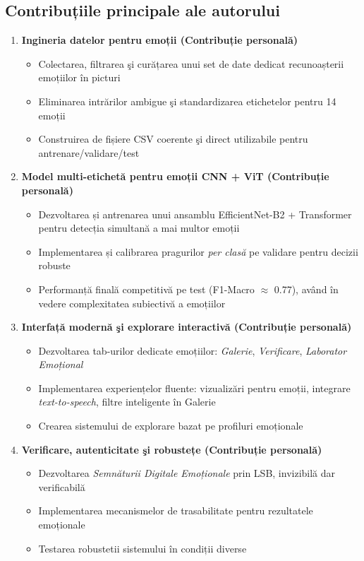 \subsection*{Contribuțiile principale ale autorului}
\begin{enumerate}
  \item \textbf{Ingineria datelor pentru emoții (Contribuție personală)}
  \begin{itemize}
    \item Colectarea, filtrarea şi curățarea unui set de date dedicat recunoașterii emoțiilor în picturi
    \item Eliminarea intrărilor ambigue şi standardizarea etichetelor pentru 14 emoții
    \item Construirea de fișiere CSV coerente şi direct utilizabile pentru antrenare/validare/test
  \end{itemize}

  \item \textbf{Model multi-etichetă pentru emoții CNN + ViT (Contribuție personală)}
  \begin{itemize}
    \item Dezvoltarea și antrenarea unui ansamblu EfficientNet-B2 + Transformer pentru detecția simultană a mai multor emoții
    \item Implementarea și calibrarea pragurilor \emph{per clasă} pe validare pentru decizii robuste
    \item Performanță finală competitivă pe test (F1-Macro $\approx$ 0.77), având în vedere complexitatea subiectivă a emoțiilor
  \end{itemize}

  \item \textbf{Interfață modernă şi explorare interactivă (Contribuție personală)}
  \begin{itemize}
    \item Dezvoltarea tab-urilor dedicate emoțiilor: \emph{Galerie}, \emph{Verificare}, \emph{Laborator Emoțional}
    \item Implementarea experiențelor fluente: vizualizări pentru emoții, integrare \emph{text-to-speech}, filtre inteligente în Galerie
    \item Crearea sistemului de explorare bazat pe profiluri emoționale
  \end{itemize}

  \item \textbf{Verificare, autenticitate şi robustețe (Contribuție personală)}
  \begin{itemize}
    \item Dezvoltarea \emph{Semnăturii Digitale Emoționale} prin LSB, invizibilă dar verificabilă
    \item Implementarea mecanismelor de trasabilitate pentru rezultatele emoționale
    \item Testarea robustetii sistemului în condiții diverse
  \end{itemize}


\end{enumerate}
